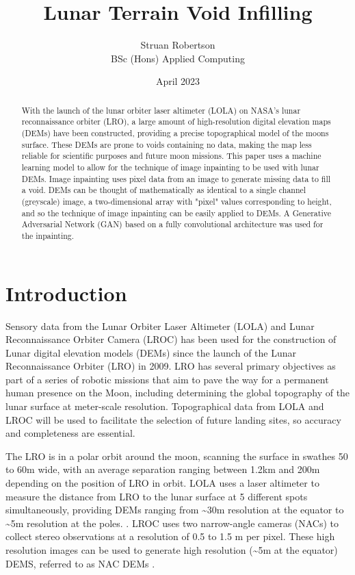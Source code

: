 \documentclass[twocolumn]{article}
\author{Struan Robertson \\ BSc (Hons) Applied Computing}
\date{April 2023}
\title{Lunar Terrain Void Infilling}
\begin{document}
\maketitle
\begin{abstract}

With the launch of the lunar orbiter laser altimeter (LOLA) on NASA's lunar reconnaissance orbiter (LRO), a large amount of high-resolution digital elevation maps (DEMs) have been constructed, providing a precise topographical model of the moons surface.
These DEMs are prone to voids containing no data, making the map less reliable for scientific purposes and future moon missions.
This paper uses a machine learning model to allow for the technique of image inpainting to be used with lunar DEMs.
Image inpainting uses pixel data from an image to generate missing data to fill a void.
DEMs can be thought of mathematically as identical to a single channel (greyscale) image, a two-dimensional array with "pixel" values corresponding to height, and so the technique of image inpainting can be easily applied to DEMs.
A Generative Adversarial Network (GAN) based on a fully convolutional architecture was used for the inpainting.


\end{abstract}

\section{Introduction}
\label{sec:org29fd873}

Sensory data from the Lunar Orbiter Laser Altimeter (LOLA) and Lunar Reconnaissance Orbiter Camera (LROC) has been used for the construction of Lunar digital elevation models (DEMs) since the launch of the Lunar Reconnaissance Orbiter (LRO) in 2009.
LRO has several primary objectives as part of a series of robotic missions that aim to pave the way for a permanent human presence on the Moon, including determining the global topography of the lunar surface at meter-scale resolution.
Topographical data from LOLA and LROC will be used to facilitate the selection of future landing sites, so accuracy and completeness are essential.
\autocite{chinLunarReconnaissanceOrbiter2007}

The LRO is in a polar orbit around the moon, scanning the surface in swathes 50 to 60m wide, with an average separation ranging between 1.2km and 200m depending on the position of LRO in orbit.
LOLA uses a laser altimeter to measure the distance from LRO to the lunar surface at 5 different spots simultaneously, providing DEMs ranging from \textasciitilde{}30m resolution at the equator to \textasciitilde{}5m resolution at the poles. \autocite{smithLunarOrbiterLaser2010}.
LROC uses two narrow-angle cameras (NACs) to collect stereo observations at a resolution of 0.5 to 1.5 m per pixel.
These high resolution images can be used to generate high resolution (\textasciitilde{}5m at the equator) DEMS, referred to as NAC DEMs \autocite{tranGeneratingDigitalTerrain2010}.
\end{document}
